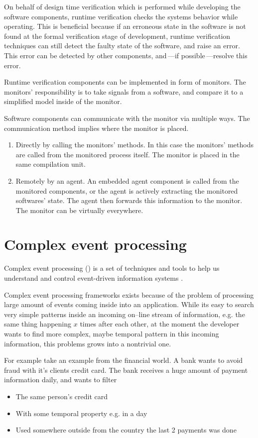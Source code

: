 On behalf of design time verification which is performed while developing the software components, runtime verification checks the systems behavior while operating. This is beneficial because if an erroneous state in the software is not found at the formal verification stage of development, runtime verification techniques can still detect the faulty state of the software, and raise an error. This error can be detected by other components, and\,---if possible\,---resolve this error.

Runtime verification components can be implemented in form of monitors. The monitors' responsibility is to take signals from a software, and compare it to a simplified model inside of the monitor.

Software components can communicate with the monitor via multiple ways. The communication method implies where the monitor is placed.
\begin{enumerate}
	\item Directly by calling the monitors' methods. In this case the monitors' methods are called from the monitored process itself. The monitor is placed in the same compilation unit.
	      \item\label{item:agent} Remotely by an agent. An embedded agent component is called from the monitored components, or the agent is actively extracting the monitored softwares' state. The agent then forwards this information to the monitor. The monitor can be virtually everywhere.
\end{enumerate}

\section{Complex event processing}

Complex event processing (\cep) is a set of techniques and tools to help us understand and control event-driven information systems \citep{Luckham:2001:PEI:515781}.

Complex event processing frameworks exists because of the problem of processing large amount of events coming inside into an application. While its easy to search  very simple patterns inside an incoming on--line stream of information, e.g. the same thing happening $x$ times after each other, at the moment the developer wants to find more complex, maybe temporal pattern in this incoming information, this problems grows into a nontrivial one.

For example take an example from the financial world. A bank wants to avoid fraud with it's clients credit card. The bank receives a huge amount of payment information daily, and wants to filter
\begin{itemize}
	\item The same person's credit card
	\item With some temporal property e.g. in a day
	\item Used somewhere outside from the country the last 2 payments was done
\end{itemize}


